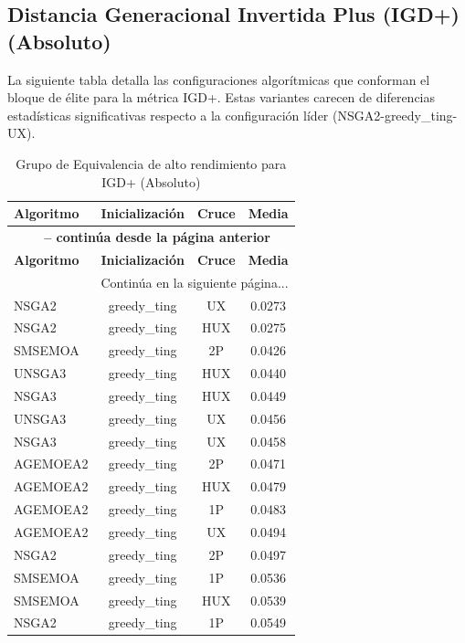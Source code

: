 \subsection{Distancia Generacional Invertida Plus (IGD+) (Absoluto)}\label{anexo:elite_igd}

La siguiente tabla detalla las configuraciones algorítmicas que conforman el bloque de élite para la métrica IGD+. Estas variantes carecen de diferencias estadísticas significativas respecto a la configuración líder (NSGA2-greedy\_ting-UX).

\begin{longtable}{lccc}
    \caption{Grupo de Equivalencia de alto rendimiento para IGD+ (Absoluto)}
    \label{tab:elite_igd} \\
    \toprule
    \textbf{Algoritmo} & \textbf{Inicialización} & \textbf{Cruce} & \textbf{Media} \\
    \midrule
    \endfirsthead
    \multicolumn{4}{c}{{\bfseries \tablename\ \thetable{} -- continúa desde la página anterior}} \\
    \toprule
    \textbf{Algoritmo} & \textbf{Inicialización} & \textbf{Cruce} & \textbf{Media} \\
    \midrule
    \endhead
    \midrule \multicolumn{4}{r}{{Continúa en la siguiente página...}} \\
    \endfoot
    \bottomrule
    \endlastfoot
    NSGA2 & greedy\_ting & UX & 0.0273 \\
NSGA2 & greedy\_ting & HUX & 0.0275 \\
SMSEMOA & greedy\_ting & 2P & 0.0426 \\
UNSGA3 & greedy\_ting & HUX & 0.0440 \\
NSGA3 & greedy\_ting & HUX & 0.0449 \\
UNSGA3 & greedy\_ting & UX & 0.0456 \\
NSGA3 & greedy\_ting & UX & 0.0458 \\
AGEMOEA2 & greedy\_ting & 2P & 0.0471 \\
AGEMOEA2 & greedy\_ting & HUX & 0.0479 \\
AGEMOEA2 & greedy\_ting & 1P & 0.0483 \\
AGEMOEA2 & greedy\_ting & UX & 0.0494 \\
NSGA2 & greedy\_ting & 2P & 0.0497 \\
SMSEMOA & greedy\_ting & 1P & 0.0536 \\
SMSEMOA & greedy\_ting & HUX & 0.0539 \\
NSGA2 & greedy\_ting & 1P & 0.0549 \\

\end{longtable}

